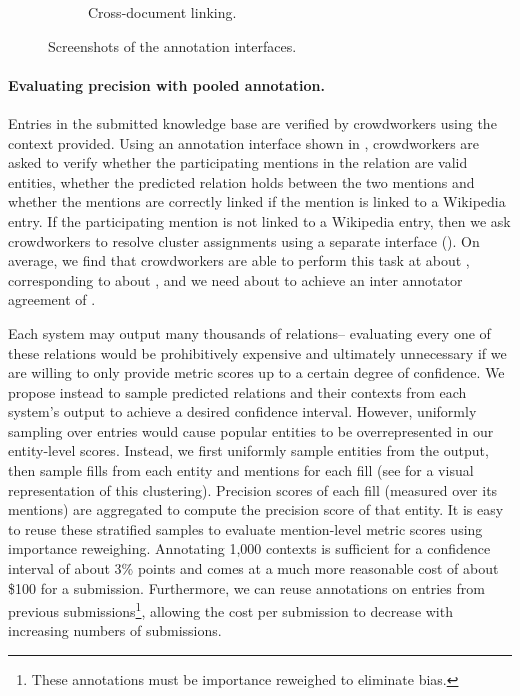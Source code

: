 \begin{figure}
\begin{subfigure}{0.31\textwidth}
  \caption{\label{fig:linking-interface} Cross-document linking.}
\end{subfigure}
\caption{\label{fig:interfaces} Screenshots of the annotation interfaces.}
\end{figure}

\paragraph{Evaluating precision with pooled annotation.}
Entries in the submitted knowledge base are verified by crowdworkers using the context provided.   
Using an annotation interface shown in ,
crowdworkers are asked to verify 
  whether the participating mentions in the relation are valid entities,
  whether the predicted relation holds between the two mentions and
  whether the mentions are correctly linked if the mention is linked to a Wikipedia entry.
If the participating mention is not linked to a Wikipedia entry,
then we ask crowdworkers to resolve cluster assignments using a separate interface ().
On average, we find that crowdworkers are able to perform this task at about , corresponding to about , and we need about  to achieve an inter annotator agreement of .

Each system may output many thousands of relations-- evaluating every one of these relations would be prohibitively expensive
  and ultimately unnecessary if we are willing to only provide metric scores up to a certain degree of confidence.
We propose instead to sample predicted relations and their contexts from each system's output to achieve a desired confidence interval.
However, uniformly sampling over entries would cause popular entities to be overrepresented in our entity-level scores.
Instead, we first uniformly sample entities from the output, then sample fills from each entity and mentions for each fill (see  for a visual representation of this clustering).
Precision scores of each fill (measured over its mentions) are aggregated to compute the precision score of that entity.
It is easy to reuse these stratified samples to evaluate mention-level metric scores using importance reweighing. 
Annotating 1,000 contexts is sufficient for a confidence interval of about 3\% points and comes at a much more reasonable cost of about \$100 for a submission. 
Furthermore, we can reuse annotations on entries from previous submissions\footnote{
These annotations must be importance reweighed to eliminate bias.},
  allowing the cost per submission to decrease with increasing numbers of submissions.

